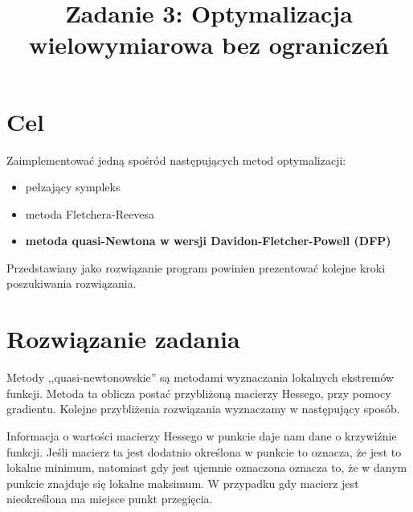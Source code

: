 \documentclass{classrep}
\author{
  \studentinfo{Paweł Musiał}{178726} \and
  \studentinfo{Łukasz Michalski}{178724}
}
\title{Zadanie 3: Optymalizacja wielowymiarowa bez ograniczeń} %
\begin{document}
\maketitle

\section{Cel}
Zaimplementować jedną spośród następujących metod optymalizacji:
\begin{itemize}
\item pełzający sympleks
\item  metoda Fletchera-Reevesa
\item \textbf{metoda quasi-Newtona w wersji Davidon-Fletcher-Powell (DFP)}
\end{itemize}
Przedstawiany jako rozwiązanie program powinien prezentować kolejne kroki poszukiwania rozwiązania.

\section{Rozwiązanie zadania}
Metody ,,quasi-newtonowskie'' są metodami wyznaczania lokalnych ekstremów funkcji. Metoda ta oblicza postać przybliżoną macierzy Hessego, przy pomocy gradientu. Kolejne przybliżenia rozwiązania wyznaczamy w następujący sposób.

Informacja o wartości macierzy Hessego w punkcie daje nam dane o krzywiźnie funkcji. Jeśli macierz ta jest dodatnio określona w punkcie to oznacza, że jest to lokalne minimum, natomiast gdy jest ujemnie oznaczona oznacza to, że w danym punkcie znajduje się lokalne maksimum. W przypadku gdy macierz jest nieokreślona ma miejsce punkt przegięcia.
\end{document}
